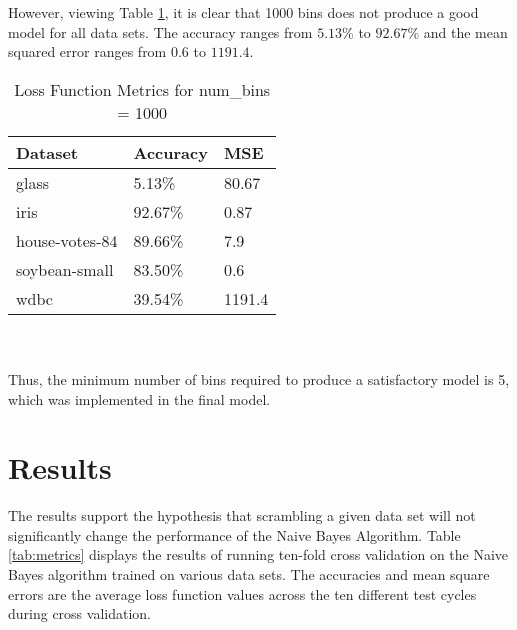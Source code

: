 \documentclass[twoside,11pt]{article}
\begin{document}
However, viewing Table \ref{tab:metrics1000}, it is clear that 1000 bins does not produce a good model for all data sets.
The accuracy ranges from $5.13\%$ to $92.67\%$ and the mean squared error ranges from $0.6$ to $1191.4$.
\begin{table}[h]
	\centering
	\caption{Loss Function Metrics for num\_bins = 1000} \label{tab:metrics1000}
	\begin{tabular}{|l|l|l|}
		\hline
		Dataset                  & Accuracy & MSE    \\ \hline
		glass                    & 5.13\%   & 80.67  \\ \hline
		iris                     & 92.67\%  & 0.87   \\ \hline
		house-votes-84           & 89.66\%  & 7.9    \\ \hline
		soybean-small            & 83.50\%  & 0.6    \\ \hline
		wdbc                     & 39.54\%  & 1191.4 \\ \hline
	\end{tabular}
\end{table} \\\\
Thus, the minimum number of bins required to produce a satisfactory model is 5, which was implemented in the final model.

\section{Results}

The results support the hypothesis that scrambling a given data set will not significantly change the performance of the Naive Bayes Algorithm.
Table \ref{tab:metrics} displays the results of running ten-fold cross validation on the Naive Bayes algorithm trained on various data sets.
The accuracies and mean square errors are the average loss function values across the ten different test cycles during cross validation.
\end{document}
